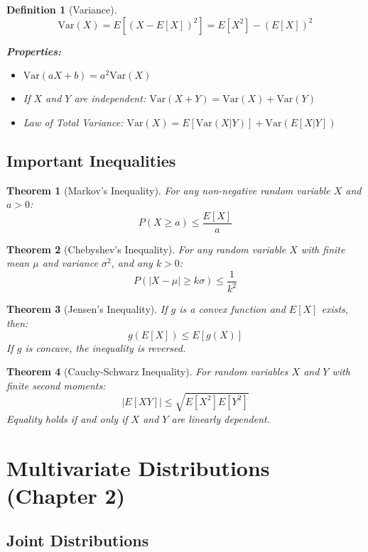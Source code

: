 \documentclass[12pt,a4paper]{amsart}
\newtheorem{theorem}{Theorem}[section]
\newtheorem{definition}{Definition}[section]
\theoremstyle{remark}
\begin{document}
\begin{definition}[Variance]
$$\text{Var}(X) = E[(X - E[X])^2] = E[X^2] - (E[X])^2$$

\textbf{Properties:}
\begin{itemize}
\item $\text{Var}(aX + b) = a^2\text{Var}(X)$
\item If $X$ and $Y$ are independent: $\text{Var}(X + Y) = \text{Var}(X) + \text{Var}(Y)$
\item Law of Total Variance: $\text{Var}(X) = E[\text{Var}(X|Y)] + \text{Var}(E[X|Y])$
\end{itemize}
\end{definition}

\subsection{Important Inequalities}

\begin{theorem}[Markov's Inequality]
For any non-negative random variable $X$ and $a > 0$:
$$P(X \geq a) \leq \frac{E[X]}{a}$$
\end{theorem}

\begin{theorem}[Chebyshev's Inequality]
For any random variable $X$ with finite mean $\mu$ and variance $\sigma^2$, and any $k > 0$:
$$P(|X - \mu| \geq k\sigma) \leq \frac{1}{k^2}$$
\end{theorem}

\begin{theorem}[Jensen's Inequality]
If $g$ is a convex function and $E[X]$ exists, then:
$$g(E[X]) \leq E[g(X)]$$
If $g$ is concave, the inequality is reversed.
\end{theorem}

\begin{theorem}[Cauchy-Schwarz Inequality]
For random variables $X$ and $Y$ with finite second moments:
$$|E[XY]| \leq \sqrt{E[X^2]E[Y^2]}$$
Equality holds if and only if $X$ and $Y$ are linearly dependent.
\end{theorem}

\section{Multivariate Distributions (Chapter 2)}

\subsection{Joint Distributions}
\end{document}
